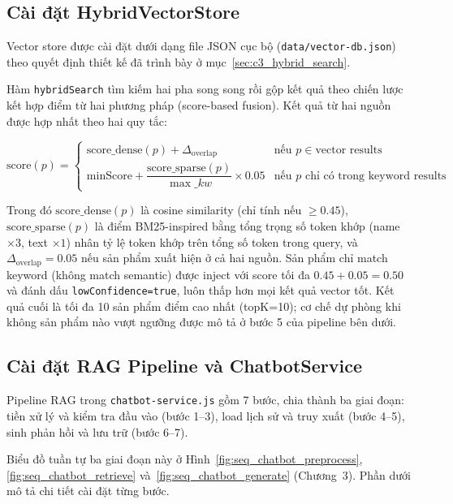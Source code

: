\subsection{Cài đặt HybridVectorStore}

Vector store được cài đặt dưới dạng file JSON cục bộ (\texttt{data/vector-db.json}) theo quyết định thiết kế đã trình bày ở mục~\ref{sec:c3_hybrid_search}.

Hàm \texttt{hybridSearch} tìm kiếm hai pha song song rồi gộp kết quả theo chiến lược kết hợp điểm từ hai phương pháp (score-based fusion). Kết quả từ hai nguồn được hợp nhất theo hai quy tắc:

\begin{equation}
\text{score}(p) =
\begin{cases}
\text{score\_dense}(p) + \Delta_{\text{overlap}} & \text{nếu } p \in \text{vector results} \\[4pt]
\text{minScore} + \dfrac{\text{score\_sparse}(p)}{\max\_kw} \times 0.05 & \text{nếu } p \text{ chỉ có trong keyword results}
\end{cases}
\label{eq:hybrid_score}
\end{equation}

Trong đó $\text{score\_dense}(p)$ là cosine similarity (chỉ tính nếu $\geq 0.45$), $\text{score\_sparse}(p)$ là điểm BM25-inspired bằng tổng trọng số token khớp (name $\times 3$, text $\times 1$) nhân tỷ lệ token khớp trên tổng số token trong query, và $\Delta_{\text{overlap}} = 0.05$ nếu sản phẩm xuất hiện ở cả hai nguồn. Sản phẩm chỉ match keyword (không match semantic) được inject với score tối đa $0.45 + 0.05 = 0.50$ và đánh dấu \texttt{lowConfidence=true}, luôn thấp hơn mọi kết quả vector tốt. Kết quả cuối là tối đa 10 sản phẩm điểm cao nhất (topK=10); cơ chế dự phòng khi không sản phẩm nào vượt ngưỡng được mô tả ở bước 5 của pipeline bên dưới.

\subsection{Cài đặt RAG Pipeline và ChatbotService}

Pipeline RAG trong \texttt{chatbot-service.js} gồm 7 bước, chia thành ba giai đoạn: tiền xử lý và kiểm tra đầu vào (bước 1--3), load lịch sử và truy xuất (bước 4--5), sinh phản hồi và lưu trữ (bước 6--7).

Biểu đồ tuần tự ba giai đoạn này ở Hình~\ref{fig:seq_chatbot_preprocess}, \ref{fig:seq_chatbot_retrieve} và~\ref{fig:seq_chatbot_generate} (Chương~3). Phần dưới mô tả chi tiết cài đặt từng bước.


